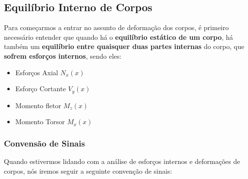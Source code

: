 \documentclass{article}
\begin{document}
        \subsection{Equilíbrio Interno de Corpos}
            Para começarmos a entrar no assunto de deformação dos corpos, é primeiro necessário entender que quando há o \textbf{equilíbrio estático de um corpo}, há também um \textbf{equilíbrio entre quaisquer duas
            partes internas} do corpo, que \textbf{sofrem esforços internos}, sendo eles:
            \begin{itemize}
                \item Esforços Axial $N_x(x)$
                \item Esforço Cortante $V_y(x)$
                \item Momento fletor $M_z(x)$
                \item Momento Torsor $M_x(x)$
            \end{itemize}

            \subsubsection{Convensão de Sinais}
                Quando estivermos lidando com a análise de esforços internos e deformações de corpos, nós iremos seguir a seguinte convenção de sinais:


    
\end{document}
